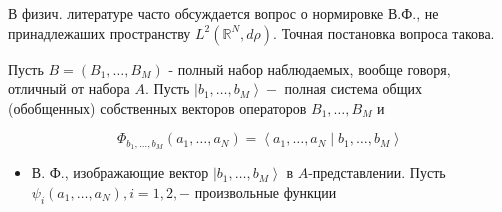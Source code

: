 \documentclass[10pt]{article}
\begin{document}
В физич. литературе часто обсуждается вопрос о нормировке В.Ф., не принадлежаших пространству $L^{2}\left(\mathbb{R}^{N}, d \rho\right)$. Точная постановка вопроса такова.



Пусть $B=\left(B_{1}, \ldots, B_{M}\right)$ - полный набор наблюдаемых, вообще говоря, отличный от набора $A$. Пусть $\left|b_{1}, \ldots, b_{M}\right\rangle-$ полная система общих (обобщенных) собственных векторов операторов $B_{1}, \ldots, B_{M}$ и



\[

\Phi_{b_{1}, \ldots, b_{M}}\left(a_{1}, \ldots, a_{N}\right)=\left\langle a_{1}, \ldots, a_{N} \mid b_{1}, \ldots, b_{M}\right\rangle

\]



\begin{itemize}

  \item В. Ф., изображающие вектор $\left|b_{1}, \ldots, b_{M}\right\rangle$ в $A$-представлении. Пусть $\psi_{i}\left(a_{1}, \ldots, a_{N}\right), i=1,2,-$ произвольные функции

\end{itemize}
\end{document}
